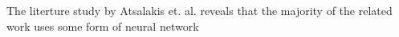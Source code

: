 The literture study by Atsalakis et. al. reveals that the majority of the related work uses some form of neural network







